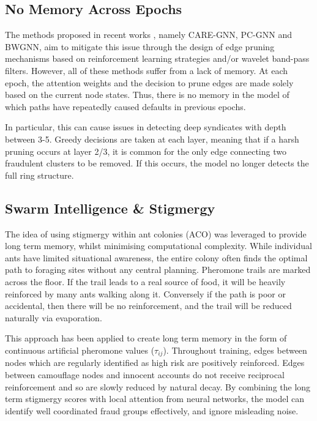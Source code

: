 \subsection{No Memory Across Epochs}
The methods proposed in recent works \cite{dou2020enhancing, liu2021pick, tang2021rethinking}, namely CARE-GNN, PC-GNN and BWGNN, aim to mitigate this issue through the design of edge pruning mechanisms based on reinforcement learning strategies and/or wavelet band-pass filters. However, all of these methods suffer from a lack of memory. At each epoch, the attention weights and the decision to prune edges are made solely based on the current node states. Thus, there is no memory in the model of which paths have repeatedly caused defaults in previous epochs.

In particular, this can cause issues in detecting deep syndicates with depth between 3-5. Greedy decisions are taken at each layer, meaning that if a harsh pruning occurs at layer 2/3, it is common for the only edge connecting two fraudulent clusters to be removed. If this occurs, the model no longer detects the full ring structure.

\subsection{Swarm Intelligence \& Stigmergy}
The idea of using stigmergy within ant colonies (ACO) \cite{dorigo1996ant, dorigo2004ant} was leveraged to provide long term memory, whilst minimising computational complexity. While individual ants have limited situational awareness, the entire colony often finds the optimal path to foraging sites without any central planning. Pheromone trails are marked across the floor. If the trail leads to a real source of food, it will be heavily reinforced by many ants walking along it. Conversely if the path is poor or accidental, then there will be no reinforcement, and the trail will be reduced naturally via evaporation.

This approach has been applied to create long term memory in the form of continuous artificial pheromone values ($\tau_{ij}$). Throughout training, edges between nodes which are regularly identified as high risk are positively reinforced. Edges between camouflage nodes and innocent accounts do not receive reciprocal reinforcement and so are slowly reduced by natural decay. By combining the long term stigmergy scores with local attention from neural networks, the model can identify well coordinated fraud groups effectively, and ignore misleading noise.


